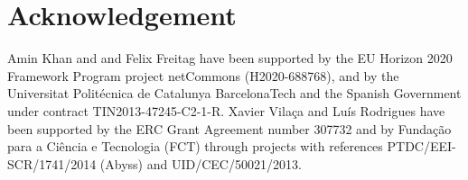
\section*{Acknowledgement}

Amin Khan and and Felix Freitag have been supported by 
    the EU Horizon 2020 Framework Program project netCommons (H2020-688768), 
    and by the Universitat Politécnica de Catalunya BarcelonaTech 
    and the Spanish Government under contract TIN2013-47245-C2-1-R. 
Xavier Vila\c{c}a and Luís Rodrigues have been supported by 
    the ERC Grant Agreement number 307732 and by 
    Funda\c c\~{a}o para a Ci\^{e}ncia e Tecnologia (FCT)
through projects with references 
    PTDC/EEI-SCR/1741/2014 (Abyss) and
    UID/CEC/50021/2013.
